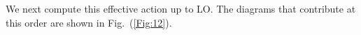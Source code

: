  We next compute this effective action up to LO. The diagrams that contribute at this order are shown in Fig.~(\ref{Fig:12}).
